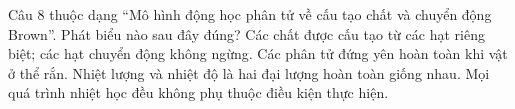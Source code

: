 \begin{ex}
Câu 8 thuộc dạng “Mô hình động học phân tử về cấu tạo chất và chuyển động Brown”. Phát biểu nào sau đây đúng?
\choice
{\True Các chất được cấu tạo từ các hạt riêng biệt; các hạt chuyển động không ngừng.}
{Các phân tử đứng yên hoàn toàn khi vật ở thể rắn.}
{Nhiệt lượng và nhiệt độ là hai đại lượng hoàn toàn giống nhau.}
{Mọi quá trình nhiệt học đều không phụ thuộc điều kiện thực hiện.}
\end{ex}
